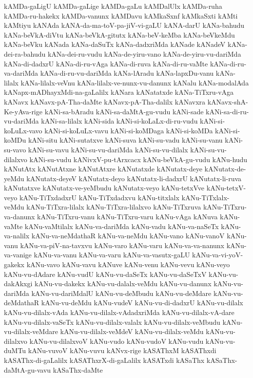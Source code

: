 {kAMDa-gaLigU
kAMDa-gaLige
kAMDa-gaLu
kAMDalUlx
kAMDa-ruha
kAMDa-ru-hakekx
kAMDa-vanunx
kAMDavu
kAMkaSxnf
kAMkaSxti
kAMti
kAMtiyu
kANAda
kANA-da-ma-toV-pa-jiV-vi-gaLU
kANA-darU
kANa-bahudu
kANa-beVkA-diVtu
kANa-beVkA-gitutx
kANa-beV-keMba
kANa-beVkeMdu
kANa-beVku
kANada
kANa-daSuTx
kANa-dadxriMda
kANade
kANadeV
kANa-dei-ra-bahudu
kANa-dei-ru-vudu
kANa-de-yiru-vano
kANa-de-yiru-vu-dariMda
kANa-di-dadxrU
kANa-di-ru-vAga
kANa-di-ruva
kANa-di-ru-vaMte
kANa-di-ru-va-dariMda
kANa-di-ru-vu-dariMda
kANa-lAradu
kANa-lapxDu-vanu
kANa-lilalx
kANa-lilalx-veVnu
kANa-lilalx-ve-nunx-vu-danunx
kANalu
kANa-modalAda
kANapx-mADhayxMdi-na-gaLalilx
kANara
kANatatxde
kANa-TiTxru-vAga
kANavx
kANavx-pA-Tha-daMte
kANavx-pA-Tha-dalilx
kANavxra
kANavx-shA-Ke-yAva-rige
kANi-sa-bAradu
kANi-sa-daMtA-gu-vudu
kANi-sade
kANi-sa-di-ru-vu-dariMda
kANi-sa-lilalx
kANi-sida
kANi-si-koLaLx-di-ru-vudu
kANi-si-koLuLx-vavo
kANi-si-koLuLx-vavu
kANi-si-koMDaga
kANi-si-koMDa
kANi-si-koMDu
kANi-situ
kANi-sutatxve
kANi-suva
kANi-su-vadu
kANi-su-vanu
kANi-su-vavo
kANi-su-vavu
kANi-su-vu-dariMda
kANi-su-vu-dilalx
kANi-su-vu-dilalxvo
kANi-su-vudu
kANivxV-pu-tArxcacx
kANu-beVkA-gu-vudu
kANu-hudu
kANutAtx
kANutAtxne
kANutAtxre
kANutatxde
kANutatx-deye
kANutatx-de-yeMdu
kANutatx-deyeV
kANutatx-deyo
kANutatx-li-dadxrU
kANutatx-li-ruva
kANutatxve
kANutatx-ve-yeMbudu
kANutatx-veyo
kANu-tetxVve
kANu-tetxV-veyo
kANu-TiTxdadxrU
kANu-TiTxdadxvu
kANu-titxlalx
kANu-TiTxlalx-veMdu
kANu-TiTxra-lilalx
kANu-TiTxra-lilalxvo
kANu-TiTxruva
kANu-TiTxru-va-danunx
kANu-TiTxru-vanu
kANu-TiTxru-varu
kANu-vAga
kANuva
kANu-vaMte
kANu-vaMtilalx
kANu-va-dariMda
kANu-vadu
kANu-va-naSeTx
kANu-va-nalilx
kANu-va-neMdathaR
kANu-va-neMdu
kANu-vano
kANu-vanoV
kANu-vanu
kANu-va-piV-na-tavxvu
kANu-varo
kANu-varu
kANu-va-va-nanunx
kANu-va-vanige
kANu-va-vanu
kANu-va-varu
kANu-va-vasutx-gaLU
kANu-va-vi-yoV-gakekx
kANu-vavo
kANu-vavu
kANuve
kANu-venu
kANu-vevu
kANu-veyo
kANu-vu-dAdare
kANu-vudU
kANu-vu-daSeTx
kANu-vu-daSeTxV
kANu-vu-dakAkxgi
kANu-vu-dakekx
kANu-vu-dalalx-veMdu
kANu-vu-danunx
kANu-vu-dariMda
kANu-vu-dariMdalU
kANu-vu-deMbudu
kANu-vu-deMdare
kANu-vu-deMdathaR
kANu-vu-deMdu
kANu-vudeV
kANu-vu-di-dadxrU
kANu-vu-dilalx
kANu-vu-dilalx-vAda
kANu-vu-dilalx-vAdadxriMda
kANu-vu-dilalx-vA-dare
kANu-vu-dilalx-vaSeTx
kANu-vu-dilalx-valalx
kANu-vu-dilalx-veMbudu
kANu-vu-dilalx-veMdare
kANu-vu-dilalx-veMdeV
kANu-vu-dilalx-veMdu
kANu-vu-dilalxvo
kANu-vu-dilalxvoV
kANu-vudo
kANu-vudoV
kANu-vudu
kANu-vu-duMTu
kANu-vuvoV
kANu-vuvu
kANvx-rige
kASAThxM
kASAThxdi
kASAThx-di-gaLalilx
kASAThxrX-di-gaLalilx
kASATxdi
kASaThx
kASaThx-daMtA-gu-vavu
kASaThx-daMte
}
